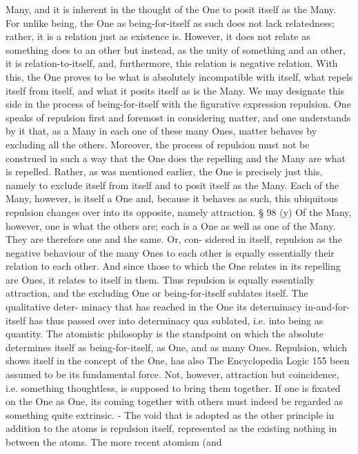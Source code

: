Many, and it is inherent in the thought of the One to posit itself as the Many. For
unlike being, the One as being-for-itself as such does not lack relatedness; rather,
it is a relation just as existence is. However, it does not relate as something does to
an other but instead, as the unity of something and an other, it is relation-to-itself,
and, furthermore, this relation is negative relation. With this, the One proves to
be what is absolutely incompatible with itself, what repels itself from itself, and
what it posits itself as is the Many. We may designate this side in the process of
being-for-itself with the figurative expression repulsion. One speaks of repulsion
first and foremost in considering matter, and one understands by it that, as a
Many in each one of these many Ones, matter behaves by excluding all the others.
Moreover, the process of repulsion must not be construed in such a way that the
One does the repelling and the Many are what is repelled. Rather, as was mentioned
earlier, the One is precisely just this, namely to exclude itself from itself and to
posit itself as the Many. Each of the Many, however, is itself a One and, because it
behaves as such, this ubiquitous repulsion changes over into its opposite, namely
attraction.
§ 98
(y) Of the Many, however, one is what the others are; each is a One as
well as one of the Many. They are therefore one and the same. Or, con-
sidered in itself, repulsion as the negative behaviour of the many Ones
to each other is equally essentially their relation to each other. And since
those to which the One relates in its repelling are Ones, it relates to
itself in them. Thus repulsion is equally essentially attraction, and the
excluding One or being-for-itself sublates itself. The qualitative deter-
minacy that has reached in the One its determinacy in-and-for-itself
has thus passed over into determinacy qua sublated, i.e. into being as
quantity.
The atomistic philosophy is the standpoint on which the absolute
determines itself as being-for-itself, as One, and as many Ones.
Repulsion, which shows itself in the concept of the One, has also
The Encyclopedia Logic
155
been assumed to be its fundamental force. Not, however, attraction
but coincidence, i.e. something thoughtless, is supposed to bring
them together. If one is fixated on the One as One, its coming
together with others must indeed be regarded as something quite
extrinsic. - The void that is adopted as the other principle in
addition to the atoms is repulsion itself, represented as the existing
nothing in between the atoms. The more recent atomism (and
